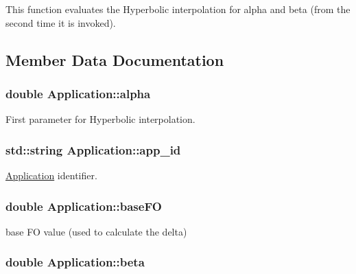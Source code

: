 This function evaluates the Hyperbolic interpolation for alpha and beta (from the second time it is invoked). 



\subsection{Member Data Documentation}
\hypertarget{classApplication_a57e16d80835a1911b72c63d5eeb5d2f2}{
\subsubsection[{alpha}]{\setlength{\rightskip}{0pt plus 5cm}double Application\-::alpha}}\label{classApplication_a57e16d80835a1911b72c63d5eeb5d2f2}


First parameter for Hyperbolic interpolation. 

\hypertarget{classApplication_a05377e6cdcb9d48f29e0f1972a4a16fe}{
\subsubsection[{app\-\_\-id}]{\setlength{\rightskip}{0pt plus 5cm}std\-::string Application\-::app\-\_\-id}}\label{classApplication_a05377e6cdcb9d48f29e0f1972a4a16fe}


\hyperlink{classApplication}{Application} identifier. 

\hypertarget{classApplication_aa703e7525d446d98b5cd51c959d35998}{
\subsubsection[{base\-F\-O}]{\setlength{\rightskip}{0pt plus 5cm}double Application\-::base\-F\-O}}\label{classApplication_aa703e7525d446d98b5cd51c959d35998}


base F\-O value (used to calculate the delta) 

\hypertarget{classApplication_a356ffae49ae223b3d98b57e56210e3a9}{
\subsubsection[{beta}]{\setlength{\rightskip}{0pt plus 5cm}double Application\-::beta}}\label{classApplication_a356ffae49ae223b3d98b57e56210e3a9}


